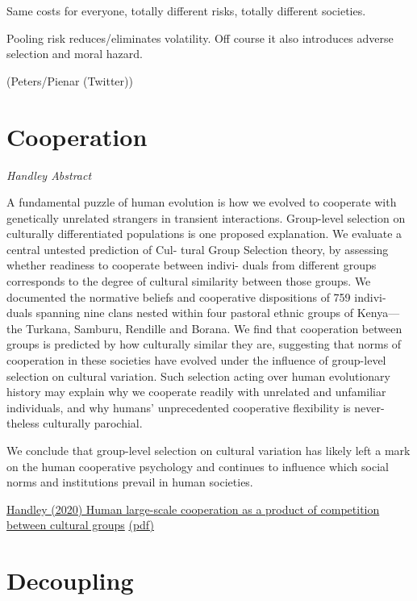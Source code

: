 \documentclass[
]{book}
\begin{document}
Same costs for everyone, totally different risks, totally different societies.

Pooling risk reduces/eliminates volatility.
Off course it also introduces adverse selection and moral hazard.

(Peters/Pienar (Twitter))

\hypertarget{cooperation}{%
\chapter{Cooperation}\label{cooperation}}

\emph{Handley Abstract}

A fundamental puzzle of human evolution is how we evolved to cooperate with genetically
unrelated strangers in transient interactions. Group-level selection on culturally differentiated
populations is one proposed explanation. We evaluate a central untested prediction of Cul-
tural Group Selection theory, by assessing whether readiness to cooperate between indivi-
duals from different groups corresponds to the degree of cultural similarity between those
groups. We documented the normative beliefs and cooperative dispositions of 759 indivi-
duals spanning nine clans nested within four pastoral ethnic groups of Kenya---the Turkana,
Samburu, Rendille and Borana. We find that cooperation between groups is predicted by how
culturally similar they are, suggesting that norms of cooperation in these societies have
evolved under the influence of group-level selection on cultural variation. Such selection
acting over human evolutionary history may explain why we cooperate readily with unrelated
and unfamiliar individuals, and why humans' unprecedented cooperative flexibility is never-
theless culturally parochial.

We conclude that group-level selection on cultural variation
has likely left a mark on the human cooperative psychology and
continues to influence which social norms and institutions prevail
in human societies.

\href{https://www.nature.com/articles/s41467-020-14416-8}{Handley (2020) Human large-scale cooperation as a product of competition between cultural groups}
\href{pdf/Handley_2020_Cooperation.pdf}{(pdf)}

\hypertarget{decoupling}{%
\chapter{Decoupling}\label{decoupling}}
\end{document}
